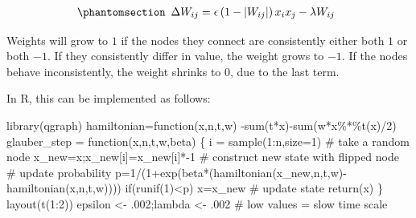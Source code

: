 \documentclass[
  a4paper,
  DIV=11,
  numbers=noendperiod,
  oneside]{scrreprt}
\newenvironment{Shaded}{}{}
\newcommand{\AttributeTok}[1]{\textcolor[rgb]{0.84,0.23,0.29}{#1}}
\newcommand{\CommentTok}[1]{\textcolor[rgb]{0.42,0.45,0.49}{#1}}
\newcommand{\ControlFlowTok}[1]{\textcolor[rgb]{0.84,0.23,0.29}{#1}}
\newcommand{\DecValTok}[1]{\textcolor[rgb]{0.00,0.36,0.77}{#1}}
\newcommand{\FunctionTok}[1]{\textcolor[rgb]{0.44,0.26,0.76}{#1}}
\newcommand{\NormalTok}[1]{\textcolor[rgb]{0.14,0.16,0.18}{#1}}
\newcommand{\OtherTok}[1]{\textcolor[rgb]{0.44,0.26,0.76}{#1}}
\newcommand{\SpecialCharTok}[1]{\textcolor[rgb]{0.00,0.36,0.77}{#1}}
\begin{document}
\begin{equation}\phantomsection\label{eq-ch6-6-old-47}{\begin{array}{r}
\mathrm{\Delta}W_{ij} = \epsilon\left( 1 - \left| W_{ij} \right| \right)x_{i}x_{j} - \lambda W_{ij}
\end{array}}\end{equation}

Weights will grow to \(1\) if the nodes they connect are consistently
either both \(1\) or both \(-1\). If they consistently differ in value,
the weight grows to \(-1\). If the nodes behave inconsistently, the
weight shrinks to \(0\), due to the last term.

In R, this can be implemented as follows:

\begin{Shaded}
\begin{Highlighting}[]
\FunctionTok{library}\NormalTok{(qgraph)}
\NormalTok{hamiltonian}\OtherTok{=}\ControlFlowTok{function}\NormalTok{(x,n,t,w) }\SpecialCharTok{{-}}\FunctionTok{sum}\NormalTok{(t}\SpecialCharTok{*}\NormalTok{x)}\SpecialCharTok{{-}}\FunctionTok{sum}\NormalTok{(w}\SpecialCharTok{*}\NormalTok{x}\SpecialCharTok{\%*\%}\FunctionTok{t}\NormalTok{(x)}\SpecialCharTok{/}\DecValTok{2}\NormalTok{)}
\NormalTok{glauber\_step }\OtherTok{=} \ControlFlowTok{function}\NormalTok{(x,n,t,w,beta)}
\NormalTok{\{}
\NormalTok{  i }\OtherTok{=} \FunctionTok{sample}\NormalTok{(}\DecValTok{1}\SpecialCharTok{:}\NormalTok{n,}\AttributeTok{size=}\DecValTok{1}\NormalTok{) }\CommentTok{\# take a random node}
\NormalTok{  x\_new}\OtherTok{=}\NormalTok{x;x\_new[i]}\OtherTok{=}\NormalTok{x\_new[i]}\SpecialCharTok{*{-}}\DecValTok{1} \CommentTok{\# construct new state with flipped node}
  \CommentTok{\# update probability}
\NormalTok{  p}\OtherTok{=}\DecValTok{1}\SpecialCharTok{/}\NormalTok{(}\DecValTok{1}\SpecialCharTok{+}\FunctionTok{exp}\NormalTok{(beta}\SpecialCharTok{*}\NormalTok{(}\FunctionTok{hamiltonian}\NormalTok{(x\_new,n,t,w)}\SpecialCharTok{{-}}\FunctionTok{hamiltonian}\NormalTok{(x,n,t,w))))  }
  \ControlFlowTok{if}\NormalTok{(}\FunctionTok{runif}\NormalTok{(}\DecValTok{1}\NormalTok{)}\SpecialCharTok{\textless{}}\NormalTok{p) x}\OtherTok{=}\NormalTok{x\_new }\CommentTok{\# update state}
  \FunctionTok{return}\NormalTok{(x)}
\NormalTok{\}}
\FunctionTok{layout}\NormalTok{(}\FunctionTok{t}\NormalTok{(}\DecValTok{1}\SpecialCharTok{:}\DecValTok{2}\NormalTok{))}
\NormalTok{epsilon }\OtherTok{\textless{}{-}}\NormalTok{ .}\DecValTok{002}\NormalTok{;lambda }\OtherTok{\textless{}{-}}\NormalTok{ .}\DecValTok{002} \CommentTok{\# low values = slow time scale}

\end{Highlighting}
\end{Shaded}
\end{document}
